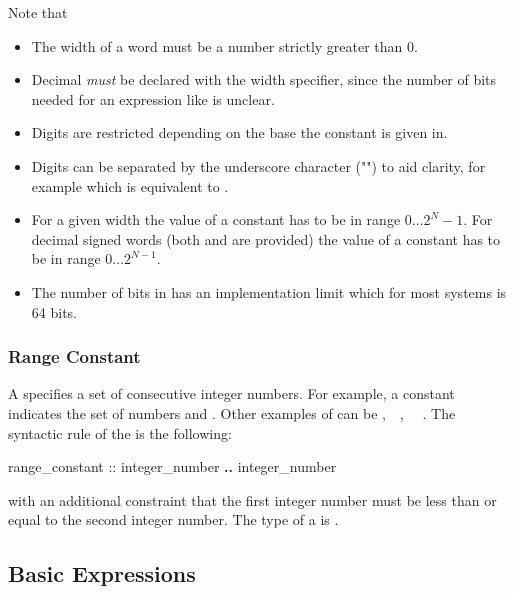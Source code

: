 \label{the notes on word constants}
\noindent Note that

\begin{itemize}
  \item The width of a word must be a number strictly greater than 0.
  \item Decimal  \textit{must} be declared
        with the width specifier, since the number of bits needed for
        an expression like  is unclear.
  \item Digits are restricted depending on the base the constant is
        given in.
  \item Digits can be separated by the underscore character
        ("{\code{\_}}") to aid clarity, for example
         which is equivalent to
        .

 \item For a given width  the value of a constant has to be in
       range $0 \ldots 2^{N}-1$. For decimal signed words (both 
       and  are provided) the value of a constant has to be in
       range $0 \ldots 2^{N-1}$.

 \item The number of bits in  has an implementation
       limit which for most systems is 64 bits.
\end{itemize}

\subsubsection{Range Constant}
\label{Range Constant}

A  specifies a set of consecutive integer
numbers. For example, a constant  indicates the set of
numbers  and . Other examples of
 can be ,\ \ ,
\ \ .
The syntactic rule of the  is the following:
\begin{Grammar}
range_constant ::
        integer_number \textbf{..} integer_number
\end{Grammar}
with an additional constraint that the first integer number must be
less than or equal to the second integer number.
%
The type of a  is \IntSet.

\subsection{Basic Expressions}
\label{Basic Expressions}


